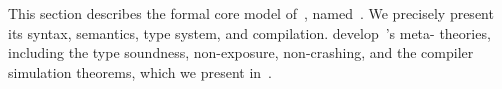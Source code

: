 


This section describes the formal core model of~\systemname,
named~\lang.
We precisely present its syntax, semantics, type
system, and compilation.
% 
% 
 develop~\lang’s meta-
theories, including the type soundness, non-exposure, non-crashing,
and the compiler simulation theorems, which we present in~.

